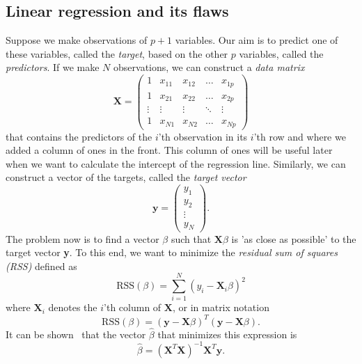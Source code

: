 \subsection{Linear regression and its flaws} \label{sec:1.1.LR}
Suppose we make observations of $p+1$ variables. Our aim is to predict one of these variables, called the \textit{target}, based on the other $p$ variables, called the \textit{predictors}. If we make $N$ observations, we can construct a \textit{data matrix }
\begin{equation*}
    \textbf{X} = \begin{pmatrix}
    1 & x_{11} & x_{12} & \dots & x_{1p}\\
    1 & x_{21} & x_{22} & \dots & x_{2p}\\
    \vdots & \vdots & \vdots & \ddots & \vdots\\
    1 & x_{N1} & x_{N2} & \dots & x_{Np}
    \end{pmatrix}
\end{equation*}
that contains the predictors of the $i$'th observation in its $i$'th row and  where we added a column of ones in the front. This column of ones will be useful later when we want to calculate the intercept of the regression line. Similarly, we can construct a vector of the targets, called the \textit{target vector}
\begin{equation*}
    \textbf{y} = \begin{pmatrix}
    y_1\\
    y_2\\
    \vdots\\
    y_N
    \end{pmatrix}.
\end{equation*}
The problem now is to find a vector $\beta$ such that $\textbf{X}\beta$ is 'as close as possible' to the target vector \textbf{y}. To this end, we want to minimize the \textit{residual sum of squares (RSS)} defined as
\begin{equation*}
    \textrm{RSS}(\beta) = \sum_{i=1}^N (y_i - \textbf{X}_i \beta)^2
\end{equation*}
where $\textbf{X}_i$ denotes the $i$'th column of $\textbf{X}$, or in matrix notation
\begin{equation*}
    \textrm{RSS}(\beta) = (\textbf{y} - \textbf{X}\beta)^T(\textbf{y} - \textbf{X}\beta).
\end{equation*}
It can be shown~\cite{SIDA2021} that the vector $\hat{\beta}$ that minimizes this expression is
\begin{equation}\label{eq:LSSest}
    \hat{\beta} = (\textbf{X}^T\textbf{X})^{-1}\textbf{X}^T\textbf{y}.
\end{equation}

